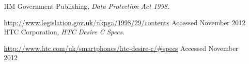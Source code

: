 \begin{thebibliography}{9}
		HM Government Publishing,
		\emph{Data Protection Act 1998}.

		\url{http://www.legislation.gov.uk/ukpga/1998/29/contents}
		Accessed November 2012
		HTC Corporation,
		\emph{HTC Desire C Specs}.

		\url{http://www.htc.com/uk/smartphones/htc-desire-c/#specs}
		Accessed November 2012
\end{thebibliography}
